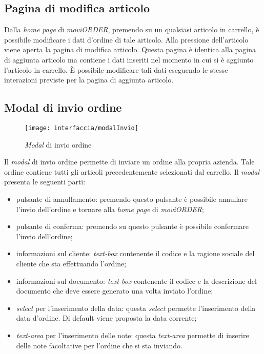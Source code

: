 \subsection{Pagina di modifica articolo}

Dalla \textit{home page} di \textit{moviORDER}, premendo su un qualsiasi articolo in carrello, è possibile modificare i dati d'ordine di tale articolo. Alla pressione dell'articolo viene aperta la pagina di modifica articolo. Questa pagina è identica alla pagina di aggiunta articolo ma contiene i dati inseriti nel momento in cui si è aggiunto l'articolo in carrello. È possibile modificare tali dati eseguendo le stesse interazioni previste per la pagina di aggiunta articolo.

\subsection{Modal di invio ordine}

\begin{figure}[!h] 
    \centering 
    \texttt{[image: interfaccia/modalInvio]} 
    \caption{\textit{Modal} di invio ordine}
\end{figure}

Il \textit{modal} di invio ordine permette di inviare un ordine alla propria azienda. Tale ordine contiene tutti gli articoli precedentemente selezionati dal carrello. Il \textit{modal} presenta le seguenti parti:
\begin{itemize}
	\item pulsante di annullamento: premendo questo pulsante è possibile annullare l'invio dell'ordine e tornare alla \textit{home page} di \textit{moviORDER};
	\item pulsante di conferma: premendo su questo pulsante è possibile confermare l'invio dell'ordine;
	\item informazioni sul cliente: \textit{text-box} contenente il codice e la ragione sociale del cliente che sta effettuando l'ordine;
	\item informazioni sul documento: \textit{text-box} contenente il codice e la descrizione del documento che deve essere generato una volta inviato l'ordine;
	\item \textit{select} per l'inserimento della data: questa \textit{select} permette l'inserimento della data d'ordine. Di default viene proposta la data corrente;
	\item \textit{text-area} per l'inserimento delle note: questa \textit{text-area} permette di inserire delle note facoltative per l'ordine che si sta inviando.
\end{itemize}


